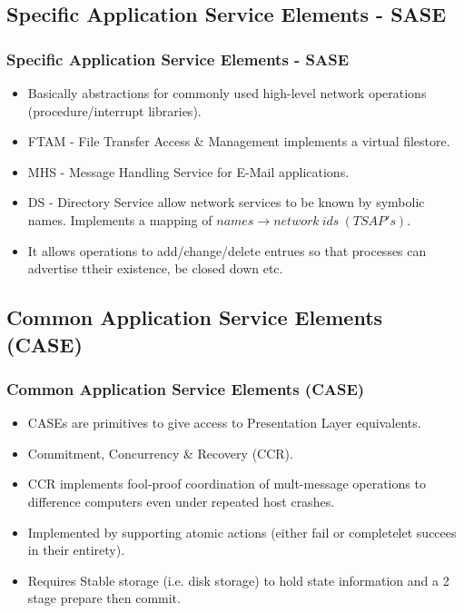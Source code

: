 \documentclass{beamer}
\begin{document}
\subsection{Specific Application Service Elements - SASE}
\begin{frame}
\frametitle{Specific Application Service Elements - SASE}
\begin{itemize}
\item Basically abstractions for commonly used high-level network operations (procedure/interrupt libraries).
\item {\color{red} FTAM - File Transfer Access \& Management} implements a virtual filestore.
\item {\color{green} MHS - Message Handling Service} for E-Mail applications.
\item {\color{purple} DS - Directory Service} allow network services to be known by symbolic names. Implements a mapping of $names \rightarrow network \ ids \ (TSAP's)$.
\item It allows operations to add/change/delete entrues so that processes can advertise ttheir existence, be closed down etc.
\end{itemize}
\end{frame}
\subsection{Common Application Service Elements (CASE)}
\begin{frame}
\frametitle{Common Application Service Elements (CASE)}
\begin{itemize}
\item CASEs are primitives to give access to {\color{red} Presentation Layer} equivalents.
\item Commitment, Concurrency \& Recovery (CCR).
\item CCR implements fool-proof coordination of mult-message operations to difference computers even under repeated host crashes.
\item Implemented by supporting {\color{green} atomic actions} (either fail or completelet succees in their entirety).
\item Requires Stable storage (i.e. disk storage) to hold state information and a 2 stage prepare then commit.
\end{itemize}
\end{frame}
\end{document}
